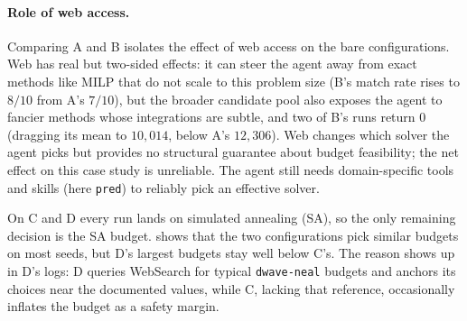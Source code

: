 \documentclass{article}
\begin{document}
\paragraph{Role of web access.}
Comparing A and B isolates the effect of web access on the bare configurations. Web has real but two-sided effects: it can steer the agent away from exact methods like MILP that do not scale to this problem size (B's match rate rises to $8/10$ from A's $7/10$), but the broader candidate pool also exposes the agent to fancier methods whose integrations are subtle, and two of B's runs return $0$ (dragging its mean to $10{,}014$, below A's $12{,}306$). Web changes which solver the agent picks but provides no structural guarantee about budget feasibility; the net effect on this case study is unreliable. The agent still needs domain-specific tools and skills (here \texttt{pred}) to reliably pick an effective solver.

On C and D every run lands on simulated annealing (SA), so the only remaining decision is the SA budget.  shows that the two configurations pick similar budgets on most seeds, but D's largest budgets stay well below C's. The reason shows up in D's logs: D queries WebSearch for typical \texttt{dwave-neal} budgets and anchors its choices near the documented values, while C, lacking that reference, occasionally inflates the budget as a safety margin.
\end{document}
